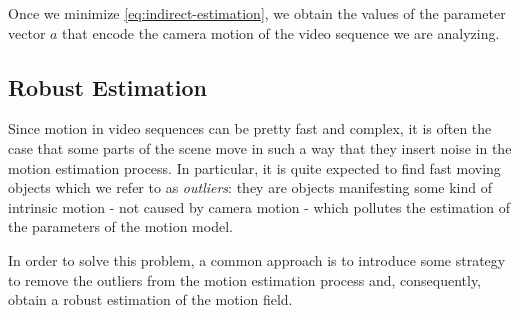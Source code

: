 

Once we minimize \cref{eq:indirect-estimation}, we obtain the values of the parameter vector $a$ that encode the camera motion of the video sequence we are analyzing.

\subsection{Robust Estimation}
Since motion in video sequences can be pretty fast and complex, it is often the case that some parts of the scene move in such a way that they insert noise in the motion estimation process.
In particular, it is quite expected to find fast moving objects which we refer to as \emph{outliers}: they are objects manifesting some kind of intrinsic motion - not caused by camera motion - which pollutes the estimation of the parameters of the motion model.

In order to solve this problem, a common approach is to introduce some strategy to remove the outliers from the motion estimation process and, consequently, obtain a robust estimation of the motion field.